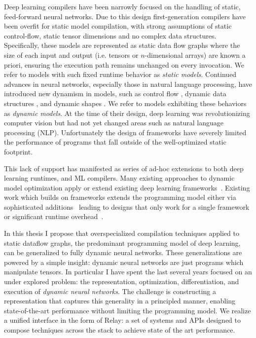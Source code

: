 Deep learning compilers have been narrowly focused
  on the handling of static, feed-forward neural networks.
Due to this design first-generation compilers have been overfit
  for static model compilation, with strong assumptions of static control-flow,
  static tensor dimensions and no complex data structures.
Specifically, these models are represented as static data flow graphs where the
  size of each input and output (i.e. tensors or $n$-dimensional arrays) are known a priori,
  ensuring the execution path remains unchanged on every invocation.
We refer to models with such fixed runtime behavior as \emph{static models}.
Continued advances in neural networks, especially those in natural language processing,
  have introduced new dynamism in models, such as control flow \citep{lstm, language_model},
  dynamic data structures \citep{tree_lstm, graph_lstm}, and dynamic shapes \citep{devlin2018bert}.
  We refer to models exhibiting these behaviors as {\em dynamic models}.
At the time of their design, deep learning was revolutionizing
  computer vision but had not yet changed areas such as natural language processing (NLP).
Unfortunately the design of frameworks have severely limited the performance
  of programs that fall outside of the well-optimized static footprint.

This lack of support has manifested as series of ad-hoc extensions to
  both deep learning runtimes, and ML compilers.
Many existing approaches to dynamic model optimization apply or
  extend existing deep learning frameworks~\citep{xu2018cavs, gao2018low, yu2018dynamic, jeong2018improving, jeong2019janus, dynet, tf_fold}.
Existing work which builds on frameworks extends the programming model either via
  sophisticated additions~\citep{yu2018dynamic} leading to designs that only work
  for a single framework or significant runtime overhead~\citep{tf_fold, jeong2019janus}.

In this thesis I propose that overspecialized
  compilation techniques applied to static dataflow graphs,
  the predominant programming model of deep learning,
  can be generalized to fully dynamic neural networks.
These generalizations are powered by a simple insight:
  dynamic neural networks are just programs which manipulate tensors.
In particular I have spent the last several years focused on an under explored problem:
  the representation,
  optimization,
  differentiation,
  and execution of \emph{dynamic neural networks}.
The challenge is constructing a representation that captures this generality
  in a principled manner, enabling state-of-the-art performance without limiting the programming model.
We realize a unified interface in the form of Relay: a set of systems and APIs designed
  to compose techniques across the stack to achieve state of the art performance.

